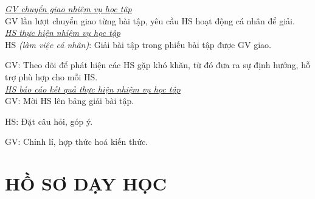 {
	\textit{\underline{GV chuyển giao nhiệm vụ học tập}}\\
	GV lần lượt chuyển giao từng bài tập, yêu cầu HS hoạt động cá nhân để giải.\\
	\textit{\underline{HS thực hiện nhiệm vụ học tập}}\\
	HS \textit{(làm việc cá nhân)}:  Giải bài tập trong phiếu bài tập được GV giao. 
	
	GV: Theo dõi để phát hiện các HS gặp khó khăn, từ đó đưa ra sự định hướng, hỗ trợ phù hợp cho mỗi HS.\\
	\textit{\underline{HS báo cáo kết quả thực hiện nhiệm vụ học tập}}\\
	GV: Mời HS lên bảng giải bài tập.
	
	HS: Đặt câu hỏi, góp ý.
	
	GV: Chỉnh lí, hợp thức hoá kiến thức.
}
\section{HỒ SƠ DẠY HỌC}
